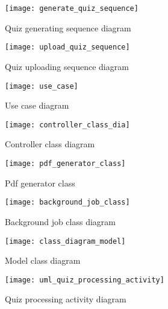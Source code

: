 \documentclass[12pt,a4paper,titlepage]{article}
\begin{document}
\begin{figure}[!ht]
\centering
\texttt{[image: generate\_quiz\_sequence]}
\caption{Quiz generating sequence diagram}\label{}
\end{figure}

\begin{figure}[!ht]
\centering
\texttt{[image: upload\_quiz\_sequence]}
\caption{Quiz uploading sequence diagram}\label{}
\end{figure}

\begin{figure}[!ht]
\centering
\texttt{[image: use\_case]}
\caption{Use case diagram}\label{}
\end{figure}

\begin{figure}[!ht]
\centering
\texttt{[image: controller\_class\_dia]}
\caption{Controller class diagram}\label{}
\end{figure}

\begin{figure}[!ht]
\centering
\texttt{[image: pdf\_generator\_class]}
\caption{Pdf generator class}\label{}
\end{figure}

\begin{figure}[!ht]
\centering
\texttt{[image: background\_job\_class]}
\caption{Background job class diagram}\label{}
\end{figure}

\begin{figure}[!ht]
\centering
\texttt{[image: class\_diagram\_model]}
\caption{Model class diagram}\label{}
\end{figure}

\begin{figure}[!ht]
\centering
\texttt{[image: uml\_quiz\_processing\_activity]}
\caption{Quiz processing activity diagram}\label{}
\end{figure}
\end{document}
